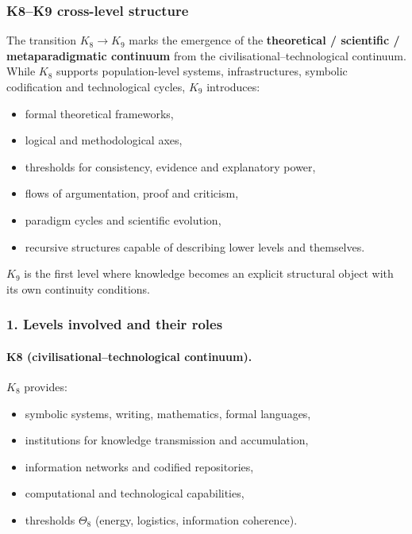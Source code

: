 
\subsubsection{K8–K9 cross-level structure}
\label{sec:crossk-k8-k9}

The transition $K_8 \rightarrow K_9$ marks the emergence of the
\textbf{theoretical / scientific / metaparadigmatic continuum} from the
civilisational–technological continuum. While $K_8$ supports population-level
systems, infrastructures, symbolic codification and technological cycles,
$K_9$ introduces:
\begin{itemize}
  \item formal theoretical frameworks,
  \item logical and methodological axes,
  \item thresholds for consistency, evidence and explanatory power,
  \item flows of argumentation, proof and criticism,
  \item paradigm cycles and scientific evolution,
  \item recursive structures capable of describing lower levels and
        themselves.
\end{itemize}

$K_9$ is the first level where knowledge becomes an explicit structural
object with its own continuity conditions.

\subsubsection{1. Levels involved and their roles}

\paragraph{K8 (civilisational–technological continuum).}
$K_8$ provides:
\begin{itemize}
  \item symbolic systems, writing, mathematics, formal languages,
  \item institutions for knowledge transmission and accumulation,
  \item information networks and codified repositories,
  \item computational and technological capabilities,
  \item thresholds $\Theta_8$ (energy, logistics, information coherence).
\end{itemize}


